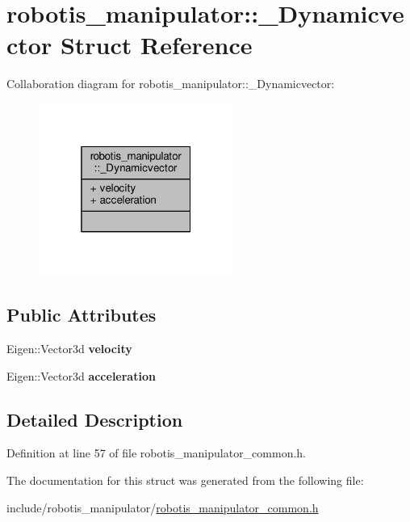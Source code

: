\hypertarget{structrobotis__manipulator_1_1___dynamicvector}{}\section{robotis\+\_\+manipulator\+:\+:\+\_\+\+Dynamicvector Struct Reference}
\label{structrobotis__manipulator_1_1___dynamicvector}


Collaboration diagram for robotis\+\_\+manipulator\+:\+:\+\_\+\+Dynamicvector\+:
\nopagebreak
\begin{figure}[H]
\begin{center}
\leavevmode
\includegraphics[width=181pt]{structrobotis__manipulator_1_1___dynamicvector__coll__graph}
\end{center}
\end{figure}
\subsection*{Public Attributes}
\begin{DoxyCompactItemize}
\item 
Eigen\+::\+Vector3d {\bfseries velocity}\hypertarget{structrobotis__manipulator_1_1___dynamicvector_a484114a8db8288972999d8272cfc5bf8}{}\label{structrobotis__manipulator_1_1___dynamicvector_a484114a8db8288972999d8272cfc5bf8}

\item 
Eigen\+::\+Vector3d {\bfseries acceleration}\hypertarget{structrobotis__manipulator_1_1___dynamicvector_afd7ebeb3adf579c2e68a20872951976a}{}\label{structrobotis__manipulator_1_1___dynamicvector_afd7ebeb3adf579c2e68a20872951976a}

\end{DoxyCompactItemize}


\subsection{Detailed Description}


Definition at line 57 of file robotis\+\_\+manipulator\+\_\+common.\+h.



The documentation for this struct was generated from the following file\+:\begin{DoxyCompactItemize}
\item 
include/robotis\+\_\+manipulator/\hyperlink{robotis__manipulator__common_8h}{robotis\+\_\+manipulator\+\_\+common.\+h}\end{DoxyCompactItemize}
